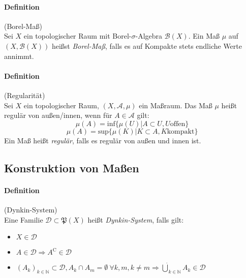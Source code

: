 \documentclass[12pt,a4paper,fleqn]{article}
\begin{document}
\paragraph{Definition}(Borel-Maß)\\
Sei $X$ ein topologischer Raum mit Borel-$\sigma$-Algebra $\mathcal{B}(X)$. Ein Maß $\mu$ auf $(X, \mathcal{B}(X))$ heißst \textit{Borel-Maß}, falls es auf Kompakte stets endliche Werte annimmt.

\paragraph{Definition}(Regularität)\\
Sei $X$ ein topologischer Raum, $(X, \mathcal{A}, \mu)$ ein Maßraum. Das Maß $\mu$ heißt regulär von außen/innen, wenn für $A \in \mathcal{A}$ gilt:
\begin{displaymath}
\mu (A) = \text{inf}\{\mu(U) \vert A \subset U, U \text{offen}\}
\end{displaymath}
\begin{displaymath}
\mu (A) = \text{sup}\{\mu(K) \vert K \subset A, K \text{kompakt}\}
\end{displaymath}
Ein Maß heißt \textit{regulär}, falls es regulär von außen und innen ist.

\subsection{Konstruktion von Maßen}

\paragraph{Definition}(Dynkin-System)\\
Eine Familie $\mathcal{D} \subset \mathfrak{P}(X)$ heißt \textit{Dynkin-System}, falls gilt:
\begin{itemize}
\item$X \in \mathcal{D}$
\item$A \in \mathcal{D} \Rightarrow A^\mathrm{C} \in \mathcal{D}$
\item$(A_k)_{k \in \mathbb{N}} \subset \mathcal{D}, A_k \cap A_m = \emptyset\ \forall k, m, k \not = m \Rightarrow \dot\bigcup_{k \in \mathbb{N}} A_k \in \mathcal{D}$
\end{itemize}
\end{document}
